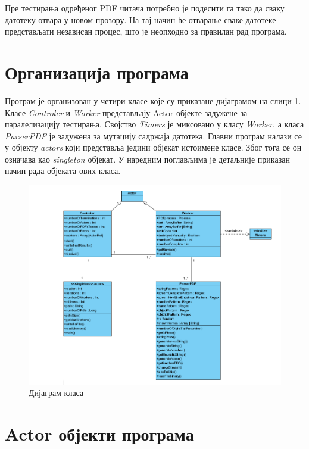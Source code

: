 \documentclass[12pt,oneside]{memoir}
\begin{document}
Пре тестирања одређеног PDF читача потребно је подесити га тако да сваку датотеку отвара у новом прозору. На тај начин ће отварање сваке датотеке представљати независан процес, што је неопходно за правилан рад програма. 

\section{Организација програма}
\label{sec:orgProg}

Програм је организован у четири класе које су приказане дијаграмом на слици \ref{fig:classDiagram}. Класе \textit{Controler} и \textit{Worker} представљају Actor објекте задужене за паралелизацију тестирања. Својство \textit{Timers} је миксовано у класу \textit{Worker}, а класа \textit{ParserPDF} је задужена за мутацију садржаја датотека. Главни програм налази се у објекту \textit{actors} који представља једини објекат истоимене класе. Због тога се он означава као \textit{singleton} објекат. У наредним поглављима је детаљније приказан начин рада објеката ових класа. 

\begin{figure}[!ht]
  \centering
  \includegraphics[width=1\textwidth]{classDiagram.png}
  \caption{Дијаграм класа}
  \label{fig:classDiagram}
\end{figure}

\section{Actor објекти програма}
\label{sec:actorObj}
\end{document}
